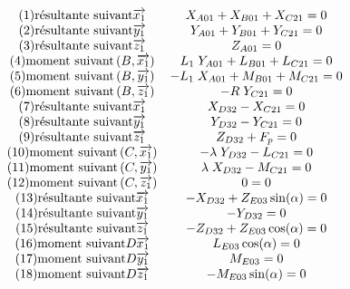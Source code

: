 \documentclass[10pt,fleqn]{article} %
\begin{document}
\begin{align*}
\begin{array}{c}
(1) \mbox{résultante suivant} \vect{x_1} \\ 
(2) \mbox{résultante suivant} \vect{y_1} \\ 
(3) \mbox{résultante suivant} \vect{z_1} \\ 
(4) \mbox{moment suivant} \axe{B}{{x_1}} \\ 
(5) \mbox{moment suivant} \axe{B}{{y_1}} \\ 
(6) \mbox{moment suivant} \axe{B}{{z_1}} \\ 
(7) \mbox{résultante suivant} \vect{x_1} \\ 
(8) \mbox{résultante suivant} \vect{y_1} \\ 
(9) \mbox{résultante suivant} \vect{z_1} \\ 
(10) \mbox{moment suivant} \axe{C}{{x_1}} \\ 
(11) \mbox{moment suivant} \axe{C}{{y_1}} \\ 
(12) \mbox{moment suivant} \axe{C}{{z_1}} \\ 
(13) \mbox{résultante suivant} \vect{x_1} \\ 
(14) \mbox{résultante suivant} \vect{y_1} \\ 
(15) \mbox{résultante suivant} \vect{z_1} \\ 
(16) \mbox{moment suivant} {D}{\vect{x_1}} \\ 
(17) \mbox{moment suivant} {D}{\vect{y_1}} \\ 
(18) \mbox{moment suivant} {D}{\vect{z_1}} \\ 
\end{array}
\begin{array}{c}
X_{A01}+X_{B01}+X_{C21}=0 \\
Y_{A01}+Y_{B01}+Y_{C21}=0 \\ 
Z_{A01}=0 \\ 
L_1\;Y_{A01}+L_{B01}+L_{C21}=0 \\ 
-L_1\;X_{A01}+M_{B01}+M_{C21}=0 \\  
-R\;Y_{C21} =0\\
X_{D32}-X_{C21}=0 \\ 
Y_{D32}-Y_{C21}=0 \\  
Z_{D32}+F_p=0 \\ 
-\lambda\;Y_{D32}-L_{C21}=0 \\ 
\lambda\;X_{D32}-M_{C21}=0 \\ 
0 =0\\
-X_{D32}+Z_{E03}\sin(\alpha)=0 \\ 
-Y_{D32}=0 \\ 
-Z_{D32}+Z_{E03}\cos(\alpha)=0 \\ 
L_{E03}\cos(\alpha)=0 \\ 
M_{E03}=0\\ 
-M_{E03}\sin(\alpha)=0\\ 
\end{array}%
\end{align*}
\end{document}
